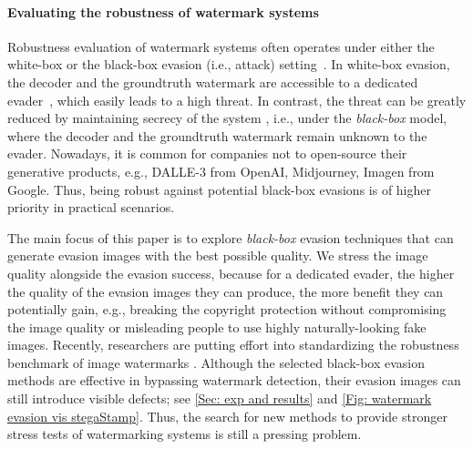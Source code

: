 \paragraph{Evaluating the robustness of watermark systems} 
Robustness evaluation of watermark systems often operates under either the white-box or the black-box evasion (i.e., attack) setting~\citep{Zhao2024SoKWF,an2024benchmarking}. In 
white-box evasion, the decoder and the groundtruth watermark are accessible to a dedicated evader~\citep{jiang2023evading}, which easily leads to a high threat. In contrast, the threat can be greatly reduced by maintaining secrecy of the system \citep{an2024benchmarking}, i.e., under the \emph{black-box} model, where the decoder and the groundtruth watermark remain unknown to the evader. Nowadays, it is common for companies not to open-source their generative products, e.g., DALLE-3 from OpenAI, Midjourney, Imagen from Google. Thus, being robust against potential black-box evasions is of higher priority in practical scenarios. 

The main focus of this paper is to explore \emph{black-box} evasion techniques that can generate evasion images with the best possible quality. We stress the image quality alongside the evasion success, because for a dedicated evader, the higher the quality of the evasion images they can produce, the more benefit they can potentially gain, e.g., breaking the copyright protection without compromising the image quality or misleading people to use highly naturally-looking fake images. Recently, researchers are putting effort into standardizing the robustness benchmark of image watermarks \citep{an2024benchmarking}. Although the selected black-box evasion methods are effective in bypassing watermark detection, their evasion images can still introduce visible defects; see \cref{Sec: exp and results} and \cref{Fig: watermark evasion vis stegaStamp}. Thus, the search for new methods to provide stronger stress tests of watermarking systems is still a pressing problem.


